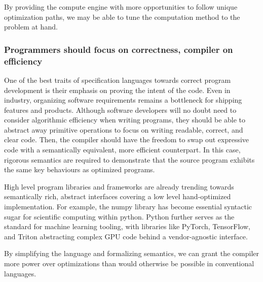 By providing the compute engine with more opportunities to follow unique optimization paths, we may be able to tune the computation method to the problem at hand.


\subsubsection{Programmers should focus on correctness, compiler on efficiency}
One of the best traits of specification languages towards correct program development is their emphasis on proving the intent of the code. Even in industry, organizing software requirements remains a bottleneck for shipping features and products. Although software developers will no doubt need to consider algorithmic efficiency when writing programs, they should be able to abstract away primitive operations to focus on writing readable, correct, and clear code. Then, the compiler should have the freedom to swap out expressive code with a semantically equivalent, more efficient counterpart. In this case, rigorous semantics are required to demonstrate that the source program exhibits the same key behaviours as optimized programs.

High level program libraries and frameworks are already trending towards semantically rich, abstract interfaces covering a low level hand-optimized implementation. For example, the numpy library has become essential syntactic sugar for scientific computing within python. Python further serves as the standard for machine learning tooling, with libraries like PyTorch, TensorFlow, and Triton abstracting complex GPU code behind a vendor-agnostic interface.

By simplifying the language and formalizing semantics, we can grant the compiler more power over optimizations than would otherwise be possible in conventional languages.

